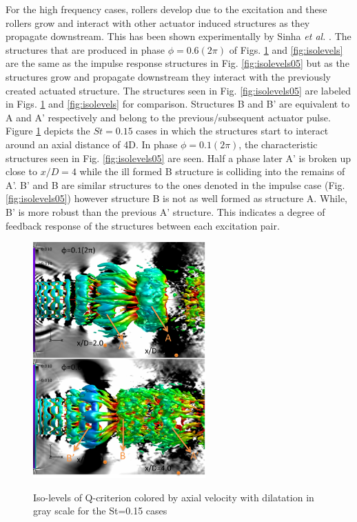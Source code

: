\documentclass[english]{aiaa-tc}
\begin{document}
For the high frequency cases, rollers develop due to the excitation and these rollers grow and interact with other actuator induced structures as they propagate downstream. This has been shown experimentally by Sinha {\em et al.} \cite{sinha2013}. The structures that are produced in phase $\phi=0.6(2\pi)$ of Figs. \ref{fig:isolevels15} and \ref{fig:isolevels} are the same as the impulse response structures in Fig. \ref{fig:isolevels05} but as the structures grow and propagate downstream they interact with the previously created actuated structure. The structures seen in Fig. \ref{fig:isolevels05} are labeled in Figs. \ref{fig:isolevels15} and \ref{fig:isolevels} for comparison. Structures B and B' are equivalent to A and A' respectively and belong to the previous/subsequent actuator pulse. 
Figure \ref{fig:isolevels15} depicts the $St=0.15$ cases in which the structures start to interact around an axial distance of 4D. In phase $\phi=0.1(2\pi)$, the characteristic structures seen in Fig. \ref{fig:isolevels05} are seen. Half a phase later A' is broken up close to $x/D=4$ while the ill formed B structure is colliding into the remains of A'. B' and B are similar structures to the ones denoted in the impulse case (Fig. \ref{fig:isolevels05}) however structure B is not as well formed as structure A. While, B' is more robust than the previous A' structure. This indicates a degree of feedback response of the structures between each excitation pair. %
\begin{figure}
\begin{center}
\begin{centering}
{\includegraphics[width=2.6in]{M09St015qcritphase0106AB}}
\end{centering}
\caption{Iso-levels of Q-criterion colored by axial velocity with dilatation in gray scale for the St=0.15 cases}
\label{fig:isolevels15}
\end{center}
\end{figure}
\end{document}
